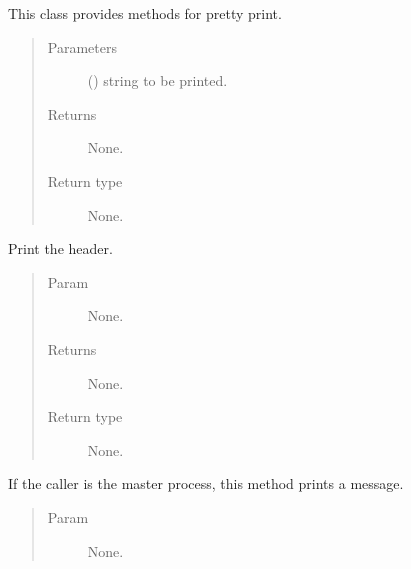 \documentclass[letterpaper,10pt,english]{sphinxmanual}
\begin{document}

\begin{fulllineitems}
\label{\detokenize{petgem/common:petgem.common.Print}}
This class provides methods for pretty print.
\begin{quote}\begin{description}
\item[{Parameters}] \leavevmode
{} () \textendash{} string to be printed.

\item[{Returns}] \leavevmode
None.

\item[{Return type}] \leavevmode
None.

\end{description}\end{quote}

\begin{fulllineitems}
\label{\detokenize{petgem/common:petgem.common.Print.header}}
Print the header.
\begin{quote}\begin{description}
\item[{Param}] \leavevmode
None.

\item[{Returns}] \leavevmode
None.

\item[{Return type}] \leavevmode
None.

\end{description}\end{quote}

\end{fulllineitems}


\begin{fulllineitems}
\label{\detokenize{petgem/common:petgem.common.Print.master}}
If the caller is the master process, this method prints a message.
\begin{quote}\begin{description}
\item[{Param}] \leavevmode
None.


\end{description}
\end{quote}
\end{fulllineitems}
\end{fulllineitems}
\end{document}
